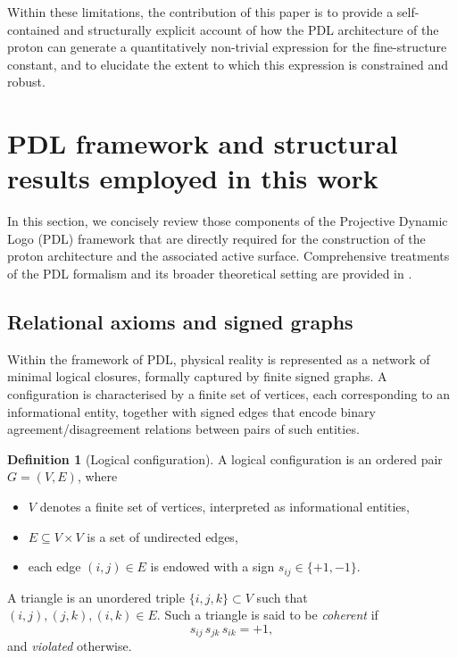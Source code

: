 \documentclass[11pt,a4paper]{article}
\theoremstyle{plain}
\theoremstyle{definition}
\newtheorem{definition}{Definition}
\theoremstyle{remark}
\begin{document}
Within these limitations, the contribution of this paper is to provide a self-contained and structurally explicit account of how the PDL architecture of the proton can generate a quantitatively non-trivial expression for the fine-structure constant, and to elucidate the extent to which this expression is constrained and robust.

\section{PDL framework and structural results employed in this work}

In this section, we concisely review those components of the Projective Dynamic Logo (PDL) framework that are directly required for the construction of the proton architecture and the associated active surface. Comprehensive treatments of the PDL formalism and its broader theoretical setting are provided in \cite{Laubscher2026IntroPDL,Laubscher2026PDL_English,Laubscher2026LDP_French}.

\subsection{Relational axioms and signed graphs}

Within the framework of PDL, physical reality is represented as a network of minimal logical closures, formally captured by finite signed graphs. A configuration is characterised by a finite set of vertices, each corresponding to an informational entity, together with signed edges that encode binary agreement/disagreement relations between pairs of such entities.

\begin{definition}[Logical configuration]
  A logical configuration is an ordered pair \(G = (V,E)\), where
  \begin{itemize}
    \item \(V\) denotes a finite set of vertices, interpreted as informational entities,
    \item \(E \subseteq V \times V\) is a set of undirected edges,
    \item each edge \((i,j) \in E\) is endowed with a sign \(s_{ij} \in \{+1,-1\}\).
  \end{itemize}
  A triangle is an unordered triple \(\{i,j,k\} \subset V\) such that
  \((i,j),(j,k),(i,k) \in E\). Such a triangle is said to be \emph{coherent} if
  \[
    s_{ij}\,s_{jk}\,s_{ik} = +1,
  \]
  and \emph{violated} otherwise.
\end{definition}
\end{document}

